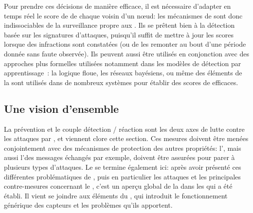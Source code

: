 Pour prendre ces décisions de manière efficace, il est nécessaire d'adapter en temps réel le score de \reput de chaque voisin d'un nœud: les mécanismes de  sont donc indissociables de la surveillance propre aux \IDS.
Ils se prêtent bien à la détection basée sur les signatures d'attaques, puisqu'il suffit de mettre à jour les scores lorsque des infractions sont constatées (ou de les remonter au bout d'une période donnée sans faute observée).
Ils peuvent aussi être utilisés en conjonction avec des approches plus formelles utilisées notamment dans les modèles de détection par apprentissage~\cite{F-GRL07,MC10}: la logique floue, les réseaux bayésiens, ou même des éléments de la  sont utilisés dans de nombreux systèmes pour établir des scores de  efficaces.

\subsection{Une vision d'ensemble}
La prévention et le couple détection / réaction sont les deux axes de lutte contre les attaques par \dds, et viennent clore cette section.
Ces mesures doivent être menées conjointement avec des mécanismes de protection des autres propriétés: l', mais aussi l'\integrite des messages échangés par exemple, doivent être assurées pour parer à plusieurs types d'attaques.
Le  se termine également ici: après avoir présenté ces différentes problématiques de \secu, puis en particulier les attaques et les principales contre-mesures concernant le \dds, c'est un aperçu global de la \secu dans les \rcs qui a été établi.
Il vient se joindre aux éléments du , qui introduit le fonctionnement générique des capteurs et les problèmes qu'ils apportent.

